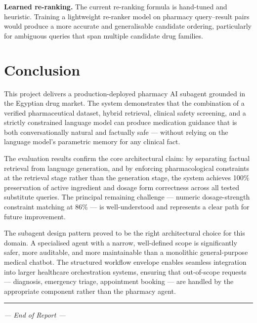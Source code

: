 \documentclass[12pt,a4paper]{article}
\begin{document}
\textbf{Learned re-ranking.} The current re-ranking formula is hand-tuned and
heuristic. Training a lightweight re-ranker model on pharmacy query--result
pairs would produce a more accurate and generalisable candidate ordering,
particularly for ambiguous queries that span multiple candidate drug families.

\section{Conclusion}

This project delivers a production-deployed pharmacy AI subagent grounded
in the Egyptian drug market. The system demonstrates that the combination
of a verified pharmaceutical dataset, hybrid retrieval, clinical safety
screening, and a strictly constrained language model can produce medication
guidance that is both conversationally natural and factually safe --- without
relying on the language model's parametric memory for any clinical fact.

The evaluation results confirm the core architectural claim: by separating
factual retrieval from language generation, and by enforcing pharmacological
constraints at the retrieval stage rather than the generation stage, the
system achieves 100\% preservation of active ingredient and dosage form
correctness across all tested substitute queries. The principal remaining
challenge --- numeric dosage-strength constraint matching at 86\% --- is
well-understood and represents a clear path for future improvement.

The subagent design pattern proved to be the right architectural choice
for this domain. A specialised agent with a narrow, well-defined scope
is significantly safer, more auditable, and more maintainable than a
monolithic general-purpose medical chatbot. The structured workflow envelope
enables seamless integration into larger healthcare orchestration systems,
ensuring that out-of-scope requests --- diagnosis, emergency triage,
appointment booking --- are handled by the appropriate component rather
than the pharmacy agent.

\vspace{1em}
\hrule
\vspace{0.5em}
{\small\textit{--- End of Report ---}}
\end{document}

